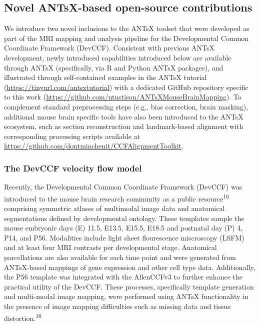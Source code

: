 \documentclass[
  12pt,
]{article}
\begin{document}
\subsection{Novel ANTsX-based open-source
contributions}\label{novel-antsx-based-open-source-contributions}

We introduce two novel inclusions to the ANTsX toolset that were
developed as part of the MRI mapping and analysis pipeline for the
Developmental Common Coordinate Framework (DevCCF). Consistent with
previous ANTsX development, newly introduced capabilities introduced
below are available through ANTsX (specifically, via R and Python ANTsX
packages), and illustrated through self-contained examples in the ANTsX
tutorial (\url{https://tinyurl.com/antsxtutorial}) with a dedicated
GitHub repository specific to this work
(\url{https://github.com/ntustison/ANTsXMouseBrainMapping}). To
complement standard preprocessing steps (e.g., bias correction, brain
masking), additional mouse brain specific tools have also been
introduced to the ANTsX ecosystem, such as section reconstruction and
landmark-based alignment with corresponding processing scripts available
at \url{https://github.com/dontminchenit/CCFAlignmentToolkit}.

\subsubsection{The DevCCF velocity flow
model}\label{the-devccf-velocity-flow-model}

Recently, the Developmental Common Coordinate Framework (DevCCF) was
introduced to the mouse brain research community as a public
resource\textsuperscript{16} comprising symmetric atlases of multimodal
image data and anatomical segmentations defined by developmental
ontology. These templates sample the mouse embryonic days (E) 11.5,
E13.5, E15.5, E18.5 and postnatal day (P) 4, P14, and P56. Modalities
include light sheet flourescence miscroscopy (LSFM) and at least four
MRI contrasts per developmental stage. Anatomical parcellations are also
available for each time point and were generated from ANTsX-based
mappings of gene expression and other cell type data. Additionally, the
P56 template was integrated with the AllenCCFv3 to further enhance the
practical utility of the DevCCF. These processes, specifically template
generation and multi-modal image mapping, were performed using ANTsX
functionality in the presence of image mapping difficulties such as
missing data and tissue distortion.\textsuperscript{16}
\end{document}
